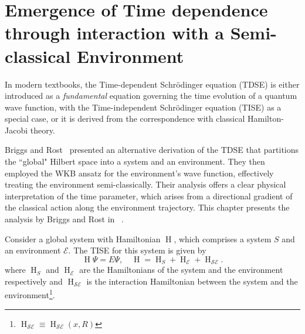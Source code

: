\chapter[Time Emergence in Quantum-Classical Interactions
]{Emergence of Time dependence 
through interaction with a Semi-classical Environment\label{chap:briggs_rost_semiclassic}}

In modern textbooks, the Time-dependent Schr\"odinger equation (TDSE) is either introduced as a \emph{fundamental}
equation governing the time evolution of a quantum wave function, with the Time-independent Schr\"odinger
equation (TISE) as a special case, or it is derived from the correspondence with classical Hamilton-Jacobi 
theory.

Briggs and Rost~\cite{briggs2001derivation} presented an alternative derivation of the TDSE that partitions
the ``global" Hilbert space into a system and an environment. They then employed the WKB ansatz 
for the environment's wave function, effectively treating the environment semi-classically. Their analysis offers a clear physical interpretation of the time parameter, which arises from a directional gradient of the classical action along the environment trajectory.
This chapter presents the analysis by Briggs and Rost in ~\cite{briggs2001derivation}.

Consider a global system with Hamiltonian $\operatorname{H}$, which comprises a system $S$ and an environment $\mathcal{E}$. 
The TISE for this system is given by
\begin{equation}
\label{eqn:chap2_TISE}
\operatorname{H}\Psi = E\Psi, \quad \operatorname{H} = \operatorname{H}_S + \operatorname{H}_{\mathcal{E}} + \operatorname{H}_{\mathcal{SE}}.
\end{equation}
where $\operatorname{H}_S$ and $\operatorname{H}_{\mathcal{E}}$ are the Hamiltonians of the system 
and the environment respectively and $\operatorname{H}_{\mathcal{SE}}$ is the interaction
Hamiltonian between the system and the environment\footnote{$\operatorname{H}_{\mathcal{SE}}\equiv \operatorname{H}_{\mathcal{SE}}(x, R)$}.

